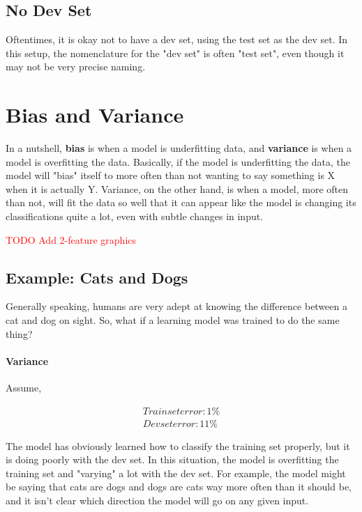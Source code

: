 \documentclass{article}
\newcommand\todo[1]{\textcolor{red}{TODO #1}}
\begin{document}
\subsection{No Dev Set}

Oftentimes, it is okay not to have a dev set, using the test set as the dev set.  In this setup, the nomenclature for the "dev set" is often "test set", even though it may not be very precise naming.

\section{Bias and Variance}

In a nutshell, \textbf{bias} is when a model is underfitting data, and \textbf{variance} is when a model is overfitting the data.  Basically, if the model is underfitting the data, the model will "bias" itself to more often than not wanting to say something is X when it is actually Y.  Variance, on the other hand, is when a model, more often than not, will fit the data so well that it can appear like the model is changing its classifications quite a lot, even with subtle changes in input.

\todo{Add 2-feature graphics}

\subsection{Example: Cats and Dogs}

Generally speaking, humans are very adept at knowing the difference between a cat and dog on sight.  So, what if a learning model was trained to do the same thing?

\paragraph{Variance}

Assume,

\begin{gather}
Train set error: 1\% \\
Dev set error: 11\%
\end{gather}

The model has obviously learned how to classify the training set properly, but it is doing poorly with the dev set.  In this situation, the model is overfitting the training set and "varying" a lot with the dev set.  For example, the model might be saying that cats are dogs and dogs are cats way more often than it should be, and it isn't clear which direction the model will go on any given input.
\end{document}
